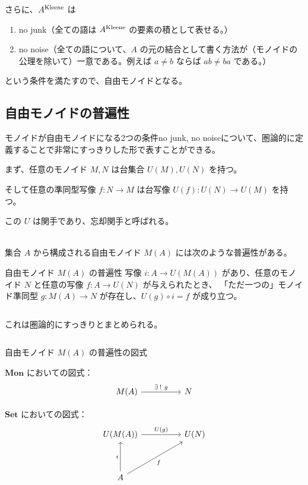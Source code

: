 \documentclass[uplatex,a4j,12pt,dvipdfmx]{jsarticle}
\begin{document}
${}$

さらに、$A^{\rm Kleene}$ は
\begin{enumerate}
	\item no junk（全ての語は $A^{\rm Kleene}$ の要素の積として表せる。）
	\item no noise（全ての語について、$A$ の元の結合として書く方法が（モノイドの公理を除いて）一意である。例えば $a\neq b$ ならば $ab \neq ba$ である。）
\end{enumerate}
という条件を満たすので、自由モノイドとなる。

\subsection{自由モノイドの普遍性}

モノイドが自由モノイドになる2つの条件no junk, no noiseについて、圏論的に定義することで非常にすっきりした形で表すことができる。

まず、任意のモノイド $M,N$ は台集合 $U(M),U(N)$ を持つ。

そして任意の準同型写像 $f: N \to M$ は台写像 $U(f) : U(N) \to U(M)$ を持つ。

この $U$ は関手であり、忘却関手と呼ばれる。

\ \\

集合 $A$ から構成される自由モノイド $M(A)$ には次のような普遍性がある。

\begin{itembox}[l]{自由モノイド $M(A)$ の普遍性}
	写像 $i: A \to U(M(A))$ があり、任意のモノイド $N$ と任意の写像 $f: A \to U(N)$ が与えられたとき、
	「ただ一つの」モノイド準同型 $g: M(A) \to N$ が存在し、$U(g) \circ i = f$ が成り立つ。
\end{itembox}

${}$

これは圏論的にすっきりとまとめられる。

${}$

\begin{itembox}[l]{自由モノイド $M(A)$ の普遍性の図式}

	$\mathbf{Mon}$ においての図式：
	\[
		\begin{tikzcd}
			M(A) \arrow[rr, "\exists \ \! ! \ g"] &  & N
		\end{tikzcd}
	\]

	$\mathbf{Set}$ においての図式：
	\[
		\begin{tikzcd}
			U(M(A)) \arrow[rr, "U(g)"]           &  & U(N) \\
			&  &      \\
			A \arrow[uu, "i"] \arrow[rruu, "f"'] &  &
		\end{tikzcd}
	\]

\end{itembox}
\end{document}
